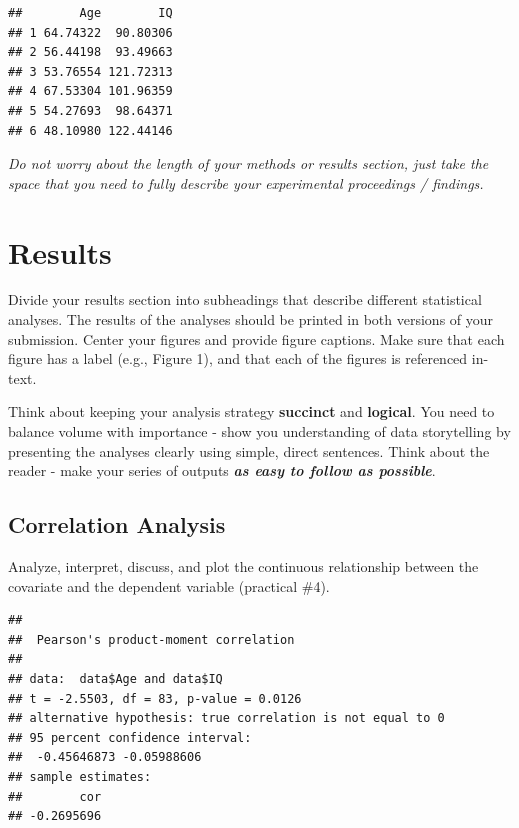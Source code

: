 \documentclass[
]{book}
\newenvironment{Shaded}{\begin{snugshade}}{\end{snugshade}}
\newcommand{\FunctionTok}[1]{\textcolor[rgb]{0.13,0.29,0.53}{\textbf{#1}}}
\newcommand{\NormalTok}[1]{#1}
\newcommand{\SpecialCharTok}[1]{\textcolor[rgb]{0.81,0.36,0.00}{\textbf{#1}}}
\begin{document}
\begin{verbatim}
##        Age        IQ
## 1 64.74322  90.80306
## 2 56.44198  93.49663
## 3 53.76554 121.72313
## 4 67.53304 101.96359
## 5 54.27693  98.64371
## 6 48.10980 122.44146
\end{verbatim}

\emph{Do not worry about the length of your methods or results section, just take the space that you need to fully describe your experimental proceedings / findings.}

\section*{Results}\label{results}

Divide your results section into subheadings that describe different statistical analyses. The results of the analyses should be printed in both versions of your submission. Center your figures and provide figure captions. Make sure that each figure has a label (e.g., Figure 1), and that each of the figures is referenced in-text.

Think about keeping your analysis strategy \textbf{succinct} and \textbf{logical}. You need to balance volume with importance - show you understanding of data storytelling by presenting the analyses clearly using simple, direct sentences. Think about the reader - make your series of outputs \textbf{\emph{as easy to follow as possible}}.

\subsection*{Correlation Analysis}\label{correlation-analysis}

Analyze, interpret, discuss, and plot the continuous relationship between the covariate and the dependent variable (practical \#4).

\begin{Shaded}
\end{Shaded}

\begin{verbatim}
## 
##  Pearson's product-moment correlation
## 
## data:  data$Age and data$IQ
## t = -2.5503, df = 83, p-value = 0.0126
## alternative hypothesis: true correlation is not equal to 0
## 95 percent confidence interval:
##  -0.45646873 -0.05988606
## sample estimates:
##        cor 
## -0.2695696
\end{verbatim}
\end{document}

